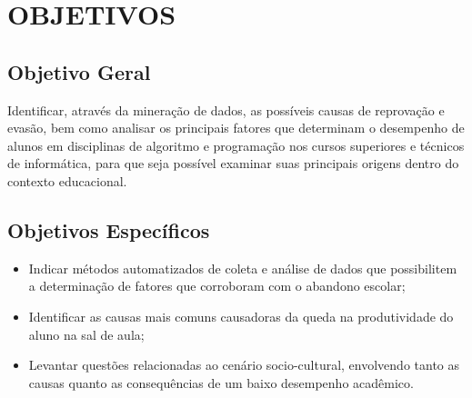 % 
%


\chapter{OBJETIVOS}
\label{chap:objetivos}

\section{Objetivo Geral}
\label{sec:objetivogeral}

Identificar, através da mineração de dados, as possíveis causas de reprovação e evasão, bem como analisar os principais fatores que  determinam o desempenho de alunos em disciplinas de algoritmo e programação nos cursos superiores e técnicos de informática, para que seja possível examinar suas principais origens dentro do contexto educacional.  

\section{Objetivos Específicos}
\label{sec:objetivosespecificos}

\begin{itemize}
    \item Indicar métodos automatizados de coleta e análise de dados que possibilitem a determinação de fatores que corroboram com o abandono escolar;
    \item Identificar as causas mais comuns causadoras da queda na produtividade do aluno na sal de aula;
    \item Levantar questões relacionadas ao cenário socio-cultural, envolvendo tanto as causas quanto as consequências de um baixo desempenho acadêmico.
\end{itemize}